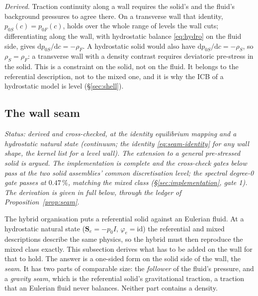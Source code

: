 \documentclass[11pt]{article}
\theoremstyle{definition}
\theoremstyle{remark}
\newcommand{\Se}{\mathbf{S}_e}
\begin{document}
\emph{Derived.} Traction continuity along a wall requires the solid's
and the fluid's background pressures to agree there. On a transverse
wall that identity, $p_{0S}(c) = p_{0F}(c)$, holds over the whole range
of levels the wall cuts; differentiating along the wall, with
hydrostatic balance \eqref{eq:hydro} on the fluid side, gives $\mathrm
dp_{0S}/\mathrm dc = -\rho_F$. A hydrostatic solid would also have
$\mathrm dp_{0S}/\mathrm dc = -\rho_S$, so $\rho_S = \rho_F$: a
transverse wall with a density contrast requires deviatoric pre-stress
in the solid. This is a constraint on the solid, not on the fluid. It
belongs to the referential description, not to the mixed one, and it is
why the ICB of a hydrostatic model is level (\S\ref{sec:shell}).

\subsection{The wall seam}
\label{sec:seam}

\emph{Status: derived and cross-checked, at the identity equilibrium
mapping and a hydrostatic natural state (continuum; the identity
\eqref{eq:seam-identity} for any wall shape, the kernel list for a
level wall). The extension to a general pre-stressed solid is argued.
The implementation is complete and the cross-check gates below pass at
the two solid assemblies' common discretisation level; the spectral
degree-0 gate passes at $0.47\,\%$, matching the mixed class
(\S\ref{sec:implementation}, gate 1). The derivation is given in full below,
through the ledger of Proposition~\ref{prop:seam}.}

The hybrid organisation puts a referential solid against an Eulerian
fluid. At a hydrostatic natural state ($\Se = -p_0 I$, $\varphi_e =
\mathrm{id}$) the referential and mixed descriptions describe the same
physics, so the hybrid must then reproduce the mixed class exactly.
This subsection derives what has to be added on the wall for that to
hold. The answer is a one-sided form on the solid side of the wall, the
\emph{seam}. It has two parts of comparable size: the \emph{follower}
of the fluid's pressure, and a \emph{gravity seam}, which is the
referential solid's gravitational traction, a traction that an
Eulerian fluid never balances. Neither part contains a density.
\end{document}
